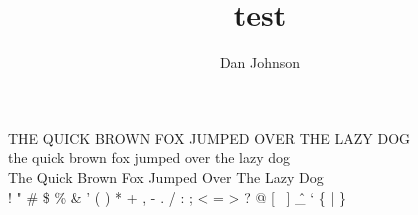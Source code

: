 \documentclass[12pt,a4paper]{article}
\author{Dan Johnson}
\title{test}
\begin{document}

    THE QUICK BROWN FOX JUMPED OVER THE LAZY DOG\\
    the quick brown fox jumped over the lazy dog\\
    The Quick Brown Fox Jumped Over The Lazy Dog\\
    ! " \# \$ \% \& ' ( ) * + , - . / : ; < = > ? @ [ \ ] \^ \_ ` \{ | \} ~
\end{document}
